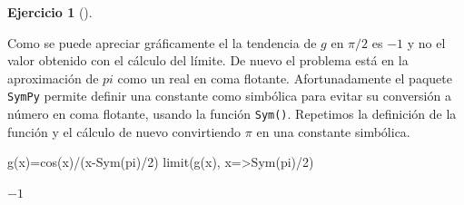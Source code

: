 \documentclass[
  a4paper,
]{scrreport}
\newenvironment{Shaded}{\begin{snugshade}}{\end{snugshade}}
\newcommand{\ConstantTok}[1]{\textcolor[rgb]{0.56,0.35,0.01}{#1}}
\newcommand{\FloatTok}[1]{\textcolor[rgb]{0.68,0.00,0.00}{#1}}
\newcommand{\FunctionTok}[1]{\textcolor[rgb]{0.28,0.35,0.67}{#1}}
\newcommand{\NormalTok}[1]{\textcolor[rgb]{0.00,0.23,0.31}{#1}}
\newcommand{\OperatorTok}[1]{\textcolor[rgb]{0.37,0.37,0.37}{#1}}
\theoremstyle{definition}
\newtheorem{exercise}{Ejercicio}[chapter]
\theoremstyle{remark}
\begin{document}
\begin{exercise}[]
\begin{tcolorbox}
\begin{figure}[H]
{}

\end{figure}

Como se puede apreciar gráficamente el la tendencia de \(g\) en
\(\pi/2\) es \(-1\) y no el valor obtenido con el cálculo del límite. De
nuevo el problema está en la aproximación de \(pi\) como un real en coma
flotante. Afortunadamente el paquete \texttt{SymPy} permite definir una
constante como simbólica para evitar su conversión a número en coma
flotante, usando la función \texttt{Sym()}. Repetimos la definición de
la función y el cálculo de nuevo convirtiendo \(\pi\) en una constante
simbólica.

\begin{Shaded}
\begin{Highlighting}[]
\FunctionTok{g}\NormalTok{(x)}\OperatorTok{=}\FunctionTok{cos}\NormalTok{(x)}\OperatorTok{/}\NormalTok{(}\FunctionTok{x{-}Sym}\NormalTok{(}\ConstantTok{pi}\NormalTok{)}\OperatorTok{/}\FloatTok{2}\NormalTok{)}
\FunctionTok{limit}\NormalTok{(}\FunctionTok{g}\NormalTok{(x), x}\OperatorTok{=\textgreater{}}\FunctionTok{Sym}\NormalTok{(}\ConstantTok{pi}\NormalTok{)}\OperatorTok{/}\FloatTok{2}\NormalTok{)}
\end{Highlighting}
\end{Shaded}

$-1$

\end{tcolorbox}

\end{exercise}
\end{document}
